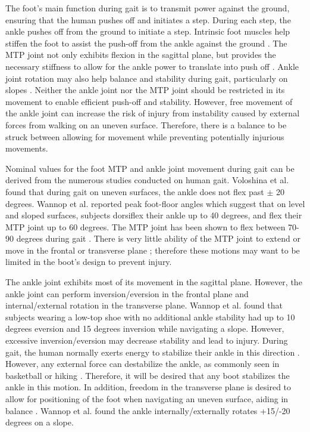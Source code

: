 \documentclass[defaultstyle,11pt]{comps}
\begin{document}
The foot's main function during gait is to transmit power against the ground, ensuring that the human pushes off and initiates a step.
During each step, the ankle pushes off from the ground to initiate a step.
Intrinsic foot muscles help stiffen the foot to assist the push-off from the ankle against the ground \citep{Farris2019}.
The MTP joint not only exhibits flexion in the sagittal plane, but provides the necessary stiffness to allow for the ankle power to translate into push off \citep{Stefanyshyn1997}.
Ankle joint rotation may also help balance and stability during gait, particularly on slopes \citep{Wannop2014}. Neither the ankle joint nor the MTP joint should be restricted in its movement to enable efficient push-off and stability.
However, free movement of the ankle joint can increase the risk of injury from instability caused by external forces from walking on an uneven surface.
Therefore, there is a balance to be struck between allowing for movement while preventing potentially injurious movements.

Nominal values for the foot MTP and ankle joint movement during gait can be derived from the numerous studies conducted on human gait.
Voloshina et al. \citep{Voloshina2013} found that during gait on uneven surfaces, the ankle does not flex past \(\pm\) 20 degrees.
Wannop et al. \citep{Wannop2014} reported peak foot-floor angles which suggest that on level and sloped surfaces, subjects dorsiflex their ankle up to 40 degrees, and flex their MTP joint up to 60 degrees.
The MTP joint has been shown to flex between 70-90 degrees during gait \citep{Mann1979}.
There is very little ability of the MTP joint to extend or move in the frontal or transverse plane \citep{Mann1979}; therefore these motions may want to be limited in the boot's design to prevent injury.

The ankle joint exhibits most of its movement in the sagittal plane.
However, the ankle joint can perform inversion/eversion in the frontal plane and internal/external rotation in the transverse plane.
Wannop et al. \citep{Wannop2014} found that subjects wearing a low-top shoe with no additional ankle stability had up to 10 degrees eversion and 15 degrees inversion while navigating a slope.
However, excessive inversion/eversion may decrease stability and lead to injury.
During gait, the human normally exerts energy to stabilize their ankle in this direction \citep{OLoughlin2009}.
However, any external force can destabilize the ankle, as commonly seen in basketball or hiking \citep{Bohm2010}.
Therefore, it will be desired that any boot stabilizes the ankle in this motion.
In addition, freedom in the transverse plane is desired to allow for positioning of the foot when navigating an uneven surface, aiding in balance \citep{Wannop2014, Fraser2016a}.
Wannop et al. \citep{Wannop2014} found the ankle internally/externally rotates +15/-20 degrees on a slope.
\end{document}
